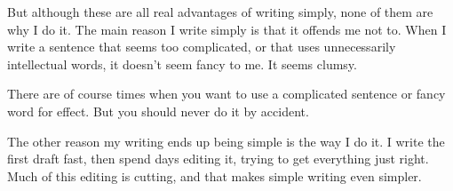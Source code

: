 But although these are all real advantages of writing simply, none of
them are why I do it. The main reason I write simply is that it offends
me not to. When I write a sentence that seems too complicated, or that
uses unnecessarily intellectual words, it doesn't seem fancy to me. It
seems clumsy.

There are of course times when you want to use a complicated sentence or
fancy word for effect. But you should never do it by accident.

The other reason my writing ends up being simple is the way I do it. I
write the first draft fast, then spend days editing it, trying to get
everything just right. Much of this editing is cutting, and that makes
simple writing even simpler.
